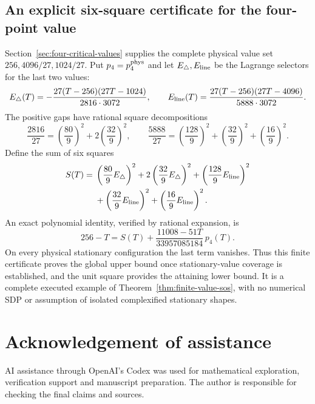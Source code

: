 \documentclass[11pt]{article}
\theoremstyle{remark}
\numberwithin{equation}{section}
\begin{document}
\subsection{An explicit six-square certificate for the four-point value}
Section~\ref{sec:four-critical-values} supplies the complete physical
value set $256,4096/27,1024/27$. Put $p_4=p_4^{\rm phys}$ and
let $E_\triangle,E_{\rm line}$ be the Lagrange selectors for the
last two values:
\[
 E_\triangle(T)=-\frac{27(T-256)(27T-1024)}{2816\cdot3072},
 \qquad
 E_{\rm line}(T)=\frac{27(T-256)(27T-4096)}{5888\cdot3072}.
\]
The positive gaps have rational square decompositions
\[
 \frac{2816}{27}=\left(\frac{80}{9}\right)^2
                      +2\left(\frac{32}{9}\right)^2,
 \qquad
 \frac{5888}{27}=\left(\frac{128}{9}\right)^2
                   +\left(\frac{32}{9}\right)^2
                   +\left(\frac{16}{9}\right)^2.
\]
Define the sum of six squares
\[
\begin{split}
 S(T)={}&\left(\frac{80}{9}E_\triangle\right)^2
       +2\left(\frac{32}{9}E_\triangle\right)^2
       +\left(\frac{128}{9}E_{\rm line}\right)^2\\
       &+\left(\frac{32}{9}E_{\rm line}\right)^2
       +\left(\frac{16}{9}E_{\rm line}\right)^2.
\end{split}
\]
An exact polynomial identity, verified by rational expansion, is
\begin{equation}\label{eq:four-value-six-squares}
 256-T=S(T)+
       \frac{11008-51T}{33957085184}\,p_4(T).
\end{equation}
On every physical stationary configuration the last term vanishes.
Thus this finite certificate proves the global upper bound once
stationary-value coverage is established, and the unit square
provides the attaining lower bound. It is a complete executed
example of Theorem~\ref{thm:finite-value-sos}, with no numerical SDP
or assumption of isolated complexified stationary shapes.

\section*{Acknowledgement of assistance}
AI assistance through OpenAI's Codex was used for mathematical
exploration, verification support and manuscript preparation.
The author is responsible for checking the final claims and sources.
\end{document}
